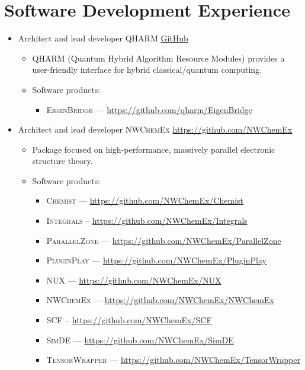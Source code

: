 \documentclass[11pt,a4paper,sans]{moderncv}
\begin{document}
\section{Software Development Experience}
\begin{itemize}
	\item{
	         {Architect and lead developer}
	         {\textsc{QHARM}}
	         {\href{https://github.com/qharm}{GitHub}}
	         {}
	         {\begin{itemize}
	         	\item{\textsc{QHARM} (Quantum Hybrid Algorithm Resource Modules)
	         		provides a user-friendly interface for hybrid classical/quantum computing.}
			\item{Software products:
				\begin{itemize}
					\item \textsc{EigenBridge} --- \url{https://github.com/qharm/EigenBridge}
				\end{itemize}
			}	
	         \end{itemize}}
	}
	\item{
		{Architect and lead developer}
		{\textsc{NWChemEx}}
		{\url{https://github.com/NWChemEx}}
		{}
		{\begin{itemize}
			\item{Package focused on high-performance, massively parallel electronic structure theory.}
		    	\item{Software products:
		    		\begin{itemize}
					\item \textsc{Chemist} --- \url{https://github.com/NWChemEx/Chemist}
			    		\item \textsc{Integrals} -- \url{https://github.com/NWChemEx/Integrals}
					\item \textsc{ParallelZone} --- \url{https://github.com/NWChemEx/ParallelZone}
			    		\item \textsc{PluginPlay} --- \url{https://github.com/NWChemEx/PluginPlay}
					\item \textsc{NUX} --- \url{https://github.com/NWChemEx/NUX}
					\item \textsc{NWChemEx} --- \url{https://github.com/NWChemEx/NWChemEx}
					\item \textsc{SCF} -- \url{https://github.com/NWChemEx/SCF}
					\item \textsc{SimDE} --- \url{https://github.com/NWChemEx/SimDE}
			    		\item \textsc{TensorWrapper} --- \url{https://github.com/NWChemEx/TensorWrapper}

\end{itemize}}
\end{itemize}}}
\end{itemize}
\end{document}
